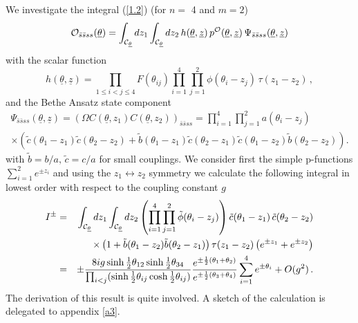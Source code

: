 \documentclass[a4paper,a4paper]{article}
\begin{document}
We investigate the integral (\ref{1.2}) (for $n=$ 4 and $m=2$) 
\[
\mathcal{O}_{\bar{s}\bar{s}ss}(\underline{\theta })=\int_{\mathcal{C}_{%
\underline{\theta }}}dz_{1}\int_{\mathcal{C}_{\underline{\theta }}}dz_{2}\,h(%
\underline{\theta },{\underline{z}})\,p^{\mathcal{O}}(\underline{\theta },{%
\underline{z}})\,\Psi _{\bar{s}\bar{s}ss}(\underline{\theta },{\underline{z}}%
) 
\]
with the scalar function 
\[
h(\underline{\theta },{\underline{z}})=\prod_{1\le i<j\le 4}F(\theta
_{ij})\prod_{i=1}^{4}\prod_{j=1}^{2}\phi (\theta _{i}-z_{j})\,\tau
(z_{1}-z_{2})\,, 
\]
and the Bethe Ansatz state component 
\begin{multline*}
\Psi _{\bar{s}\bar{s}ss}(\underline{\theta },{\underline{z}})=\left( \Omega
C({\underline{\theta }},z_{1})C({\underline{\theta }},z_{2})\right) _{\bar{s}%
\bar{s}ss}=\prod_{i=1}^{4}\prod_{j=1}^{2}a(\theta _{i}-z_{j}) \\
\times \left( \tilde{c}(\theta _{1}-z_{1})\tilde{c}(\theta _{2}-z_{2})+%
\tilde{b}(\theta _{1}-z_{1})\tilde{c}(\theta _{2}-z_{1})\tilde{c}(\theta
_{1}-z_{2})\tilde{b}(\theta _{2}-z_{2})\right) .
\end{multline*}
with $\tilde{b}=b/a,\,\tilde{c}=c/a$ for small couplings. We consider first
the simple p-functions $\sum_{i=1}^{2}e^{\pm z_{i}}$ and using the $%
z_{1}\leftrightarrow z_{2}$ symmetry we calculate the following integral in
lowest order with respect to the coupling constant $g$ 
\begin{eqnarray}
I^{\pm } &=&\int_{\mathcal{C}_{\underline{\theta }}}dz_{1}\int_{\mathcal{C}_{%
\underline{\theta }}}dz_{2}\left( \prod_{i=1}^{4}\prod_{j=1}^{2}\tilde{\phi}%
(\theta _{i}-z_{j})\right) \tilde{c}(\theta _{1}-z_{1})\,\tilde{c}(\theta
_{2}-z_{2})  \nonumber \\
&&\times \left( 1+\tilde{b}(\theta _{1}-z_{2})\tilde{b}(\theta
_{2}-z_{1})\right) \tau (z_{1}-z_{2})\left( e^{\pm z_{1}}+e^{\pm
z_{2}}\right)  \nonumber \\
&=&\pm \frac{8ig\sinh \tfrac{1}{2}\theta _{12}\sinh \tfrac{1}{2}\theta _{34}%
}{\prod_{i<j}(\sinh \frac{1}{2}\theta _{ij}\cosh \frac{1}{2}\theta _{ij})}%
\frac{e^{\pm \frac{1}{2}(\theta _{1}+\theta _{2})}}{e^{\pm \frac{1}{2}%
(\theta _{3}+\theta _{4})}}\sum_{i=1}^{4}e^{\pm \theta _{i}}+O(g^{2})\,.
\label{4.7}
\end{eqnarray}
The derivation of this result is quite involved. A sketch of the calculation
is delegated to appendix \ref{a3}.
\end{document}
